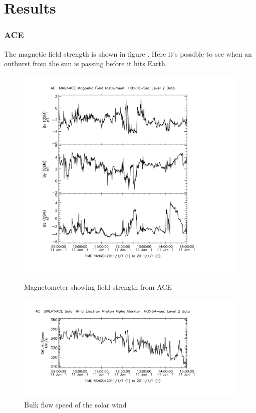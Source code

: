 \chapter{Results}
\label{chap:Results}


\subsection{ACE}

The magnetic field strength is shown in figure . Here it's possible to see when an outburst from the sun is passing before it hits Earth. 

\begin{figure}[h!]
\centering
\begin{minipage}{0.49\textwidth}
\includegraphics[width=\textwidth]{Figures/ACE/AC_H0_MFI_19370_000.pdf}
\caption{Magnetometer showing field strength from ACE}
\label{fig:ACE_MFI}
\end{minipage}
\begin{minipage}{0.49\textwidth}
\includegraphics[width = \textwidth]{Figures/ACE/AC_H0_SWE_19370_001.pdf}
\caption{Bulk flow speed of the solar wind}
\label{fig:ACE_SWE}
\end{minipage}
\end{figure}

